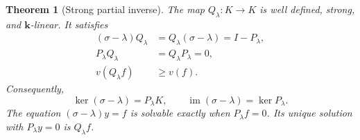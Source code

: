 \documentclass[11pt,oneside]{article}
\numberwithin{equation}{section}
\newtheorem{theorem}{Theorem}[section]
\theoremstyle{definition}
\theoremstyle{remark}
\newcommand{\kk}{\mathbf k}
\newcommand{\im}{\operatorname{im}}
\begin{document}
\begin{theorem}[Strong partial inverse]\label{dsup:thm:resolvent}
The map $Q_\lambda:K\to K$ is well defined, strong, and $\kk$-linear.
It satisfies
\begin{align}
 (\sigma-\lambda)Q_\lambda
   &=Q_\lambda(\sigma-\lambda)=I-P_\lambda,\label{dsup:eq:resolvent-identities}\\
 P_\lambda Q_\lambda&=Q_\lambda P_\lambda=0,\label{dsup:eq:normalization}\\
 v(Q_\lambda f)&\ge v(f).\label{dsup:eq:valuation-Q}
\end{align}
Consequently,
\begin{equation}\label{dsup:eq:kerim}
 \ker(\sigma-\lambda)=P_\lambda K,
 \qquad \im(\sigma-\lambda)=\ker P_\lambda.
\end{equation}
The equation $(\sigma-\lambda)y=f$ is solvable exactly when
$P_\lambda f=0$. Its unique solution with $P_\lambda y=0$ is $Q_\lambda f$.
\end{theorem}
\end{document}
